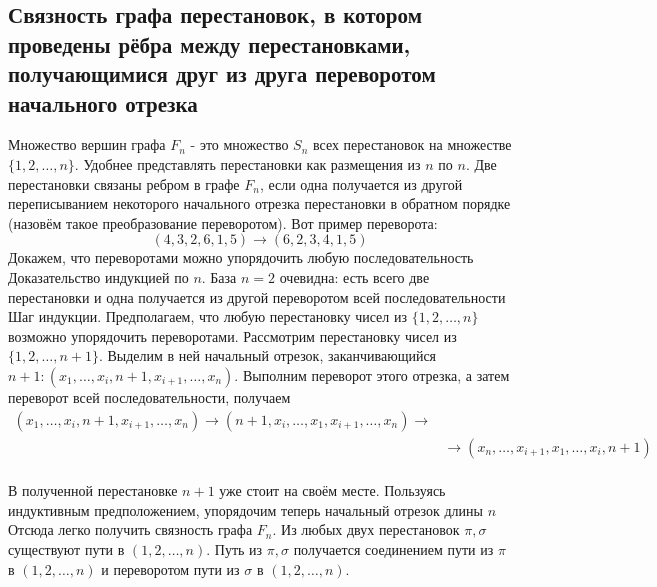 \documentclass[a4paper]{article}
\begin{document}
\subsection{Связность графа перестановок, в котором проведены рёбра между перестановками, получающимися друг из друга переворотом начального отрезка}
Множество вершин графа $F_{n}$ - это множество $S_{n}$ всех перестановок на множестве $\{1,2, \ldots, n\}$. Удобнее представлять перестановки как размещения из $n$ по $n$. Две перестановки связаны ребром в графе $F_{n}$, если одна получается из другой переписыванием некоторого начального отрезка перестановки в обратном порядке (назовём такое преобразование переворотом). Вот пример переворота:
$$
(4,3,2,6,1,5) \rightarrow(6,2,3,4,1,5)
$$
Докажем, что переворотами можно упорядочить любую последовательность\\[2mm]
Доказательство индукцией по $n$. База $n=2$ очевидна: есть всего две перестановки и одна получается из другой переворотом всей последовательности\\[2mm]
Шаг индукции. Предполагаем, что любую перестановку чисел из $\{1,2, \ldots, n\}$ возможно упорядочить переворотами. Рассмотрим перестановку чисел из $\{1,2, \ldots, n+1\}$. Выделим в ней начальный отрезок, заканчивающийся $n+1:\left(x_{1}, \ldots, x_{i}, n+1, x_{i+1}, \ldots, x_{n}\right)$. Выполним переворот этого отрезка, а затем переворот всей последовательности, получаем
$$
\begin{aligned}
\left(x_{1}, \ldots, x_{i}, n+1, x_{i+1}, \ldots, x_{n}\right) \rightarrow\left(n+1, x_{i}, \ldots, x_{1}, x_{i+1}, \ldots, x_{n}\right) \rightarrow & \\
& \rightarrow\left(x_{n}, \ldots, x_{i+1}, x_{1}, \ldots, x_{i}, n+1\right)
\end{aligned}
$$\\[2mm]
В полученной перестановке $n+1$ уже стоит на своём месте. Пользуясь индуктивным предположением, упорядочим теперь начальный отрезок длины $n$\\[2mm]
Отсюда легко получить связность графа $F_{n}$. Из любых двух перестановок $\pi, \sigma$ существуют пути в $(1,2, \ldots, n)$. Путь из $\pi, \sigma$ получается соединением пути из $\pi$ в $(1,2, \ldots, n)$ и переворотом пути из $\sigma$ в $(1,2, \ldots, n)$.
\end{document}
